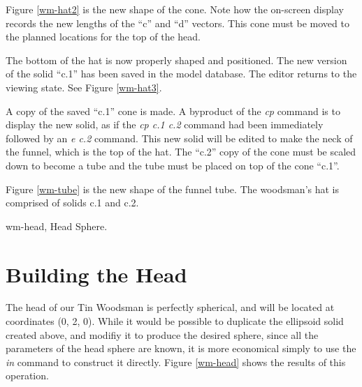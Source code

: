 Figure \ref{wm-hat2} is the new shape of the cone.
Note how the on-screen display records the new lengths of the ``c''
and ``d'' vectors.
This cone must be moved to the planned locations for the top of the head.


The bottom of the hat is now properly shaped and positioned.  The
new version of the solid ``c.1'' has been saved in the model database.
The editor returns to the viewing state.  See Figure \ref{wm-hat3}.

A copy of the saved ``c.1'' cone is made.  A byproduct of the {\em cp}
command is to display the new solid, as if the {\em cp c.1 c.2} command
had been immediately followed by an {\em e c.2} command.
This new solid will be edited to make the neck of the funnel,
which is the top of the hat.
The ``c.2'' copy of the cone must be
scaled down to become a tube and the tube must be placed on top of the
cone ``c.1''.


Figure \ref{wm-tube} is the new shape of the funnel tube.
The woodsman's hat is comprised of solids c.1 and c.2.

\mfig wm-head, Head Sphere.
\section{Building the Head}

The head of our Tin Woodsman is perfectly spherical, and will be located
at coordinates (0, 2, 0).
While it would be possible to duplicate the ellipsoid solid created above,
and modifiy it to produce the desired sphere, since all the parameters
of the head sphere are known, it is more economical simply to use
the {\em in} command to construct it directly.
Figure \ref{wm-head} shows the results of this operation.

